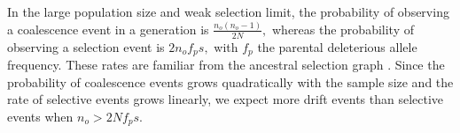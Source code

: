 \documentclass[review]{elsarticle}
\newcommand{\ra}{\rightarrow}
\newcommand{\afs}[2]{\Phi_{#1}^{(#2)}}
\newcommand{\sgcomment}[1]{\textcolor{red}{SG: #1}}
\newcommand{\ikcomment}[1]{\textcolor{blue}{IK: #1}}
\begin{document}
 
%
%
%
%
%
%
%
%
%
%
%
%
%
%
%
%
%
%
%

In the large population size and weak selection limit, the probability of observing a coalescence event 
in a generation is $\frac{n_o(n_o-1)}{2 N},$ whereas the probability of observing a selection event is
$2 n_o f_p s,$ with $f_p$ the parental deleterious allele frequency. These rates are familiar from the 
ancestral selection graph  \citep{KroneNeuhauser1997}. 
Since the probability of coalescence events grows quadratically with the sample size and the 
rate of selective events grows linearly, we expect  more drift events than selective events when 
$n_o>2Nf_p s.$ 
\end{document}
